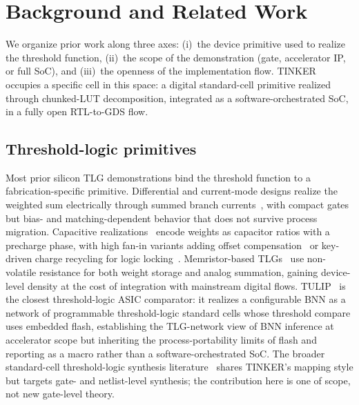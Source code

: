 \documentclass[conference]{IEEEtran}
\begin{document}
\section{Background and Related Work}
\label{sec:background}

We organize prior work along three axes: (i)~the device primitive
used to realize the threshold function, (ii)~the scope of the
demonstration (gate, accelerator IP, or full SoC), and (iii)~the
openness of the implementation flow. TINKER occupies a specific
cell in this space: a digital standard-cell primitive realized
through chunked-LUT decomposition, integrated as a software-orchestrated
SoC, in a fully open RTL-to-GDS flow.

\subsection{Threshold-logic primitives}
Most prior silicon TLG demonstrations bind the threshold function
to a fabrication-specific primitive. Differential and current-mode
designs realize the weighted sum electrically through summed
branch currents~\cite{beiu2003differential}, with compact gates
but bias- and matching-dependent behavior that does not survive
process migration. Capacitive realizations~\cite{ozdemir1996capacitive}
encode weights as capacitor ratios with a precharge phase, with
high fan-in variants adding offset
compensation~\cite{sahruri2024hictl} or key-driven charge
recycling for logic locking~\cite{sahruri2025tlglock}.
Memristor-based TLGs~\cite{papandroulidakis2019memristor} use
non-volatile resistance for both weight storage and analog
summation, gaining device-level density at the cost of integration
with mainstream digital flows. TULIP~\cite{wagle2020tulip} is the
closest threshold-logic ASIC comparator: it realizes a configurable
BNN as a network of programmable threshold-logic standard cells
whose threshold compare uses embedded flash, establishing the
TLG-network view of BNN inference at accelerator scope but
inheriting the process-portability limits of flash and reporting
as a macro rather than a software-orchestrated SoC. The broader
standard-cell threshold-logic synthesis
literature~\cite{beiu2003vlsi} shares TINKER's mapping style but
targets gate- and netlist-level synthesis; the contribution here
is one of scope, not new gate-level theory.
\end{document}

